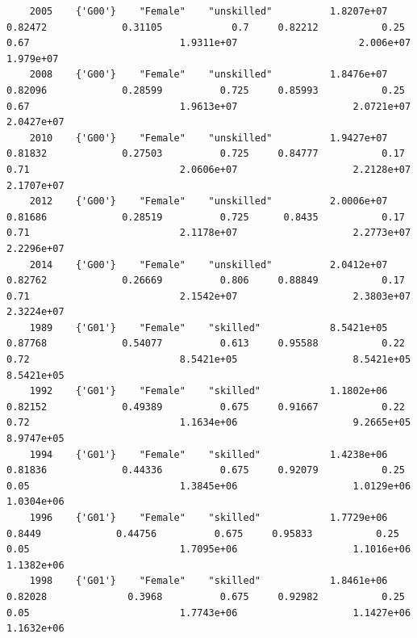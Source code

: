 \documentclass[
]{book}
\begin{document}
\begin{verbatim}
    2005    {'G00'}    "Female"    "unskilled"          1.8207e+07            0.82472             0.31105            0.7     0.82212           0.25               0.67                          1.9311e+07                     2.006e+07              1.979e+07        
    2008    {'G00'}    "Female"    "unskilled"          1.8476e+07            0.82096             0.28599          0.725     0.85993           0.25               0.67                          1.9613e+07                    2.0721e+07             2.0427e+07        
    2010    {'G00'}    "Female"    "unskilled"          1.9427e+07            0.81832             0.27503          0.725     0.84777           0.17               0.71                          2.0606e+07                    2.2128e+07             2.1707e+07        
    2012    {'G00'}    "Female"    "unskilled"          2.0006e+07            0.81686             0.28519          0.725      0.8435           0.17               0.71                          2.1178e+07                    2.2773e+07             2.2296e+07        
    2014    {'G00'}    "Female"    "unskilled"          2.0412e+07            0.82762             0.26669          0.806     0.88849           0.17               0.71                          2.1542e+07                    2.3803e+07             2.3224e+07        
    1989    {'G01'}    "Female"    "skilled"            8.5421e+05            0.87768             0.54077          0.613     0.95588           0.22               0.72                          8.5421e+05                    8.5421e+05             8.5421e+05        
    1992    {'G01'}    "Female"    "skilled"            1.1802e+06            0.82152             0.49389          0.675     0.91667           0.22               0.72                          1.1634e+06                    9.2665e+05             8.9747e+05        
    1994    {'G01'}    "Female"    "skilled"            1.4238e+06            0.81836             0.44336          0.675     0.92079           0.25               0.05                          1.3845e+06                    1.0129e+06             1.0304e+06        
    1996    {'G01'}    "Female"    "skilled"            1.7729e+06             0.8449             0.44756          0.675     0.95833           0.25               0.05                          1.7095e+06                    1.1016e+06             1.1382e+06        
    1998    {'G01'}    "Female"    "skilled"            1.8461e+06            0.82028              0.3968          0.675     0.92982           0.25               0.05                          1.7743e+06                    1.1427e+06             1.1632e+06        

\end{verbatim}
\end{document}
